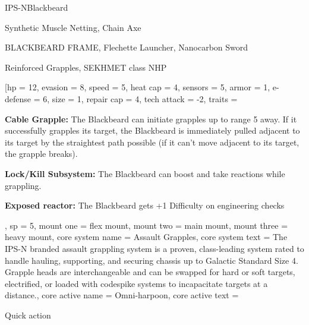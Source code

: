 

\begin{mech}{IPS-N}{Blackbeard}


\begin{license}
\item Synthetic Muscle Netting, Chain Axe
\item BLACKBEARD FRAME, Flechette Launcher, Nanocarbon Sword
\item Reinforced Grapples, SEKHMET class NHP
\end{license}

\frameBox
[hp = 12,
evasion = 8,
speed = 5,
heat cap = 4,
sensors = 5,
armor = 1,
e-defense = 6,
size = 1,
repair cap = 4,
tech attack = -2,
traits = {\textbf{Cable Grapple:} The Blackbeard can initiate grapples up to range 5 away. If it successfully grapples its target, the Blackbeard is immediately pulled adjacent to its target by the straightest path possible (if it can’t move adjacent to its target, the grapple breaks).

\textbf{Lock/Kill Subsystem:} The Blackbeard can boost and take reactions while grappling.

\textbf{Exposed reactor:} The Blackbeard gets +1 Difficulty on engineering checks},
sp = 5,
mount one = flex mount,
mount two = main mount,
mount three = heavy mount,
core system name = Assault Grapples,
core system text = {The IPS-N branded assault grappling system is a proven, class-leading system rated to handle hauling, supporting, and securing chassis up to Galactic Standard Size 4. Grapple heads are interchangeable and can be swapped for hard or soft targets, electrified, or loaded with codespike systems to incapacitate targets at a distance.},
core active name = Omni-harpoon,
core active text = {Quick action

}
\end{mech}
